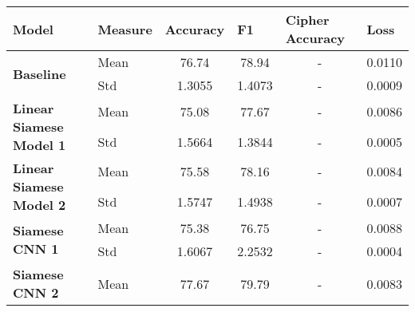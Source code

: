 \begin{table}[]
\centering
\begin{tabular}{|llcccc|}
\hline
\textbf{Model}                                            & \textbf{Measure}            & \multicolumn{1}{l}{\textbf{Accuracy}} & \multicolumn{1}{l}{\textbf{F1}} & \multicolumn{1}{l}{\textbf{Cipher Accuracy}} & \multicolumn{1}{l|}{\textbf{Loss}} \\ \hline
\multirow{2}{*}{\textbf{Baseline}}               & Mean            & 76.74                        & 78.94                  & -                                   & 0.0110                    \\
                                                 & Std & 1.3055                       & 1.4073                 & -                                   & 0.0009                    \\ \hline
\multirow{2}{*}{\textbf{Linear Siamese Model 1}} & Mean            & 75.08                        & 77.67                  & -                                   & 0.0086                    \\
                                                 & Std & 1.5664                       & 1.3844                 & -                                   & 0.0005                    \\ \hline
\multirow{2}{*}{\textbf{Linear Siamese Model 2}} & Mean            & 75.58                        & 78.16                  & -                                   & 0.0084                    \\
                                                 & Std & 1.5747                       & 1.4938                 & -                                   & 0.0007                    \\ \hline
\multirow{2}{*}{\textbf{Siamese CNN 1}}          & Mean            & 75.38                        & 76.75                  & -                                   & 0.0088                    \\
                                                 & Std & 1.6067                       & 2.2532                 & -                                   & 0.0004                    \\ \hline
\multirow{2}{*}{\textbf{Siamese CNN 2}}          & Mean            & 77.67                        & 79.79                  & -                                   & 0.0083                    \\

\end{tabular}
\end{table}
